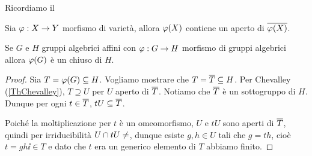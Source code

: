 Ricordiamo il 
\begin{theorem}[di Chevalley]
Sia $\varphi:X\to Y$ morfismo di variet\`a, allora $\varphi(X)$ contiene un aperto di $\overline{\varphi(X)}$.
\end{theorem}

\begin{corollary}
Se $G$ e $H$ gruppi algebrici affini con $\varphi:G\to H$ morfismo di gruppi algebrici allora $\varphi(G)$ \`e un chiuso di $H$.
\end{corollary}
\begin{proof}
Sia $T=\varphi(G)\subseteq H$. Vogliamo mostrare che $T=\overline{T}\subseteq H$. Per Chevalley (\ref{ThChevalley}), $T\supseteq U$ per $U$ aperto di $\overline{T}$. Notiamo che $\overline{T}$ \`e un sottogruppo di $H$. Dunque per ogni $t\in \overline{T}$, $tU\subseteq \overline{T}$.

Poich\'e la moltiplicazione per $t$ \`e un omeomorfismo, $U$ e $tU$ sono aperti di $\overline{T}$, quindi per irriducibilit\`a $U\cap tU\neq \empty$, dunque esiste $g,h\in U$ tali che $g=th$, cio\`e $t=gh\ii\in T$ e dato che $t$ era un generico elemento di $T$ abbiamo finito.
\end{proof}

